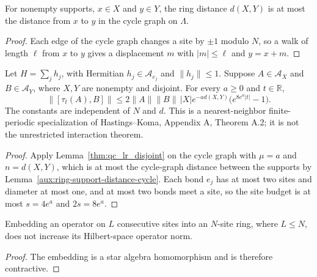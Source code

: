 \begin{lemma}
    \label{aux:ring-support-distance-cycle}
    \leanok
    For nonempty supports, $x\in X$ and $y\in Y$, the ring distance $d(X,Y)$ is at most
    the distance from $x$ to $y$ in the cycle graph on $\Lambda$.
\end{lemma}
\begin{proof}\leanok
    Each edge of the cycle graph changes a site by $\pm1$ modulo $N$, so a walk of length
    $\ell$ from $x$ to $y$ gives a displacement $m$ with $|m|\le\ell$ and $y=x+m$.
\end{proof}

\begin{lemma}
    \label{aux:finite-ring-lieb-robinson}
    \leanok
    Let $H=\sum_j h_j$, with Hermitian $h_j\in\mathcal A_{e_j}$ and
    $\|h_j\|\leq1$. Suppose $A\in\mathcal A_X$ and $B\in\mathcal A_Y$,
    where $X,Y$ are nonempty and disjoint. For every $a\geq0$ and $t\in\mathbb R$,
    \[
        \|[\tau_t(A),B]\|
        \leq2\|A\|\|B\|\,|X|e^{-a d(X,Y)}
        \bigl(e^{8e^a|t|}-1\bigr).
    \]
    The constants are independent of $N$ and $d$. This is a nearest-neighbor
    finite-periodic specialization of Hastings--Koma, Appendix A, Theorem A.2;
    it is not the unrestricted interaction theorem.
\end{lemma}
\begin{proof}\leanok
    Apply Lemma~\ref{thm:qc_lr_disjoint} on the cycle graph with $\mu=a$ and
    $n=d(X,Y)$, which is at most the cycle-graph distance between the supports by
    Lemma~\ref{aux:ring-support-distance-cycle}. Each bond $e_j$ has at most two sites
    and diameter at most one, and at most two bonds meet a site, so the site budget is at
    most $s=4e^a$ and $2s=8e^a$.
\end{proof}

\begin{lemma}
    \label{aux:cyclic-local-embedding-norm}
    \leanok
    Embedding an operator on $L$ consecutive sites into an $N$-site ring,
    where $L\leq N$, does not increase its Hilbert-space operator norm.
\end{lemma}
\begin{proof}\leanok
    The embedding is a star algebra homomorphism and is therefore contractive.
\end{proof}


